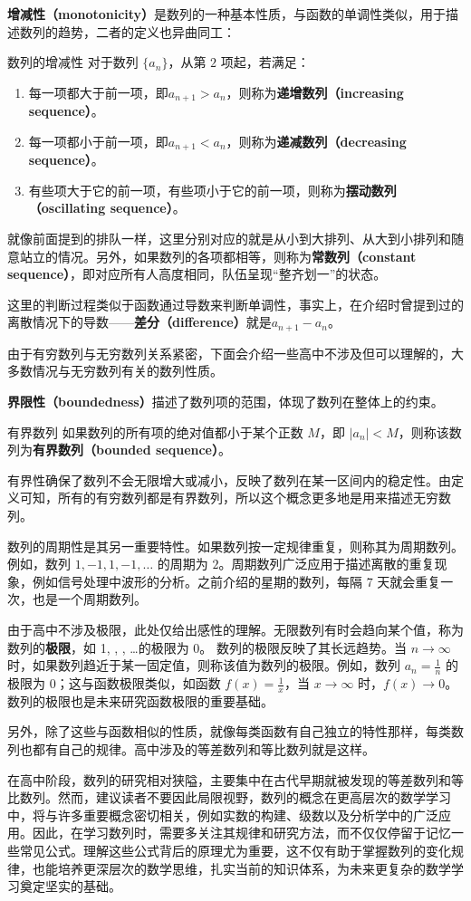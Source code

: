 \textbf{增减性（monotonicity）}是数列的一种基本性质，与函数的单调性类似，用于描述数列的趋势，二者的定义也异曲同工：

\begin{definition}{数列的增减性}
对于数列 $\{a_n\}$，从第 $2$ 项起，若满足：
\begin{enumerate}
\item 每一项都大于前一项，即$a_{n+1} > a_n$，则称为\textbf{递增数列（increasing sequence）}。
\item 每一项都小于前一项，即$a_{n+1} < a_n$，则称为\textbf{递减数列（decreasing sequence）}。
\item 有些项大于它的前一项，有些项小于它的前一项，则称为\textbf{摆动数列（oscillating sequence）}。
\end{enumerate}
\end{definition}

就像前面提到的排队一样，这里分别对应的就是从小到大排列、从大到小排列和随意站立的情况。另外，如果数列的各项都相等，则称为\textbf{常数列（constant sequence）}，即对应所有人高度相同，队伍呈现“整齐划一”的状态。

这里的判断过程类似于函数通过导数来判断单调性，事实上，在介绍时曾提到过的离散情况下的导数——\textbf{差分（difference）}就是$a_{n+1}-a_n$。

由于有穷数列与无穷数列关系紧密，下面会介绍一些高中不涉及但可以理解的，大多数情况与无穷数列有关的数列性质。

\textbf{界限性（boundedness）}描述了数列项的范围，体现了数列在整体上的约束。

\begin{definition}{有界数列}
如果数列的所有项的绝对值都小于某个正数 $M$，即 $\lvert a_n \rvert < M$，则称该数列为\textbf{有界数列（bounded sequence）}。
\end{definition}

有界性确保了数列不会无限增大或减小，反映了数列在某一区间内的稳定性。由定义可知，所有的有穷数列都是有界数列，所以这个概念更多地是用来描述无穷数列。

数列的周期性是其另一重要特性。如果数列按一定规律重复，则称其为周期数列。例如，数列 $1, -1, 1, -1, \dots$ 的周期为 $2$。周期数列广泛应用于描述离散的重复现象，例如信号处理中波形的分析。之前介绍的星期的数列，每隔 7 天就会重复一次，也是一个周期数列。

由于高中不涉及极限，此处仅给出感性的理解。无限数列有时会趋向某个值，称为数列的\textbf{极限}，如 1, , , \dots  的极限为 0。
数列的极限反映了其长远趋势。当 $n \to \infty$ 时，如果数列趋近于某一固定值，则称该值为数列的极限。例如，数列 $a_n = \frac{1}{n}$ 的极限为 $0$；这与函数极限类似，如函数 $f(x) = \frac{1}{x}$，当 $x \to \infty$ 时，$f(x) \to 0$。数列的极限也是未来研究函数极限的重要基础。

另外，除了这些与函数相似的性质，就像每类函数有自己独立的特性那样，每类数列也都有自己的规律。高中涉及的等差数列和等比数列就是这样。

在高中阶段，数列的研究相对狭隘，主要集中在古代早期就被发现的等差数列和等比数列。然而，建议读者不要因此局限视野，数列的概念在更高层次的数学学习中，将与许多重要概念密切相关，例如实数的构建、级数以及分析学中的广泛应用。因此，在学习数列时，需要多关注其规律和研究方法，而不仅仅停留于记忆一些常见公式。理解这些公式背后的原理尤为重要，这不仅有助于掌握数列的变化规律，也能培养更深层次的数学思维，扎实当前的知识体系，为未来更复杂的数学学习奠定坚实的基础。
